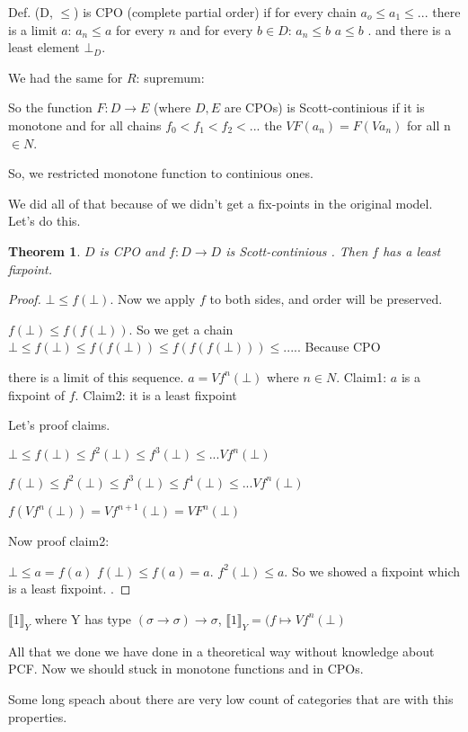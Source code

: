 \documentclass[a4paper,10pt]{book}
\newtheorem{theorem}{Theorem}
\newcommand{\sem}[2]{ \llbracket#1\rrbracket_{#2} }
\newcommand{\rarr}{ \rightarrow }
\begin{document}
Def. (D, $\leq$) is CPO (complete partial order) if for every chain $a_o \leq a_1 \leq ...$
there is a limit $a$: $a_n\leq a$ for every $n$ and for every $b\in D$: $a_n\leq b$ $a\leq b$ .
and there is a least element $\bot_D$.

We had the same for $R$: supremum:

So the function $F: D \rarr E$  (where $D,E$ are CPOs) is Scott-continious 
if it is monotone and for all chains  $f_0 < f_1 < f_2 < ...$
the $V F(a_n) = F(V a_n)$ for all n $\in N$.

So, we restricted monotone function to continious ones. 

We did all of that because of we didn't get a fix-points in the original model. Let's do this.


\begin{theorem}
$D$ is CPO and $f: D \rarr D$ is Scott-continious . Then $f$ has a least fixpoint.
\end{theorem}
\begin{proof}
$\bot \leq f(\bot)$. Now we apply $f$ to both sides, and order will be preserved.

$f(\bot) \leq  f(f(\bot))$. So we get a chain
$\bot \leq f(\bot) \leq f(f(\bot)) \leq f(f(f(\bot))) \leq ....$. Because CPO


there is a limit of this sequence. $a = Vf^n(\bot)$ where $n\in N$. 
Claim1: $a$ is a fixpoint of $f$.
Claim2: it is a least fixpoint

Let's proof claims.

$\bot \leq f(\bot) \leq f^2(\bot) \leq f^3(\bot) \leq ... Vf^n(\bot)$

$f(\bot) \leq f^2(\bot) \leq f^3(\bot) \leq f^4(\bot) \leq ... Vf^n(\bot)$

$f(Vf^n(\bot)) = Vf^{n+1}(\bot) = VF^n(\bot)$

Now proof claim2:
 
 $\bot \leq a = f(a)$
 $f(\bot) \leq f(a) = a$.
 $f^2(\bot) \leq a$.  So we showed a fixpoint which is a least fixpoint.
.
\end{proof}

$\sem1{Y}$ where Y has type $(\sigma\rarr\sigma)\rarr\sigma$,
$\sem1{Y} = (f \mapsto V f^n(\bot)$

All that we done we have done in a theoretical way without knowledge about PCF. Now we
should stuck in monotone functions and in CPOs.

Some long speach about there are very low count of categories that are with this properties.
\end{document}
